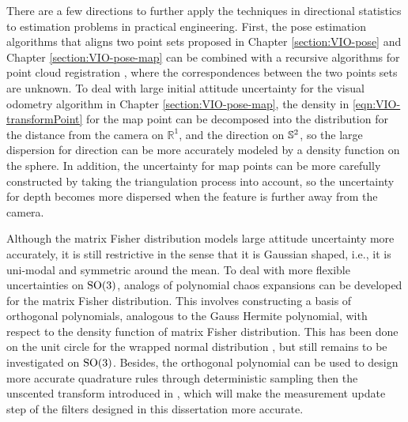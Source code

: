 There are a few directions to further apply the techniques in directional statistics to estimation problems in practical engineering.
First, the pose estimation algorithms that aligns two point sets proposed in Chapter \ref{section:VIO-pose} and Chapter \ref{section:VIO-pose-map} can be combined with a recursive algorithms for point cloud registration \cite{arun2018probabilistic,besl1992method,myronenko2010point}, where the correspondences between the two points sets are unknown.
To deal with large initial attitude uncertainty for the visual odometry algorithm in Chapter \ref{section:VIO-pose-map}, the density in \eqref{eqn:VIO-transformPoint} for the map point can be decomposed into the distribution for the distance from the camera on $\mathbb{R}^1$, and the direction on $\mathbb{S}^2$, so the large dispersion for direction can be more accurately modeled by a density function on the sphere.
In addition, the uncertainty for map points can be more carefully constructed by taking the triangulation process into account, so the uncertainty for depth becomes more dispersed when the feature is further away from the camera.

Although the matrix Fisher distribution models large attitude uncertainty more accurately, it is still restrictive in the sense that it is Gaussian shaped, i.e., it is uni-modal and symmetric around the mean.
To deal with more flexible uncertainties on $\mathrm{SO}(3)$, analogs of polynomial chaos expansions can be developed for the matrix Fisher distribution.
This involves constructing a basis of orthogonal polynomials, analogous to the Gauss Hermite polynomial, with respect to the density function of matrix Fisher distribution.
This has been done on the unit circle for the wrapped normal distribution \cite{jones2019stochastic,schmid2020angular}, but still remains to be investigated on $\mathrm{SO}(3)$.
Besides, the orthogonal polynomial can be used to design more accurate quadrature rules through deterministic sampling then the unscented transform introduced in \cite{gilitschenski2015unscented,lee2018bayesian}, which will make the measurement update step of the filters designed in this dissertation more accurate.
